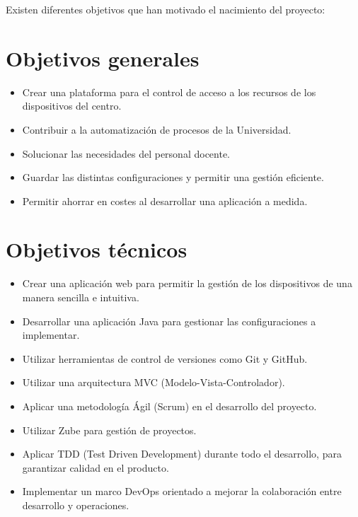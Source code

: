 
Existen diferentes objetivos que han motivado el nacimiento del proyecto:

\section{Objetivos generales}\label{sec:objetivos-generales}
    \begin{itemize}
        \item Crear una plataforma para el control de acceso a los recursos de los dispositivos del centro.
        \item Contribuir a la automatización de procesos de la Universidad.
        \item Solucionar las necesidades del personal docente.
        \item Guardar las distintas configuraciones y permitir una gestión eficiente.
        \item Permitir ahorrar en costes al desarrollar una aplicación a medida.
    \end{itemize}


\section{Objetivos técnicos}\label{sec:objetivos-tecnicos}
    \begin{itemize}
        \item Crear una aplicación web para permitir la gestión de los dispositivos de una manera sencilla e intuitiva.
        \item Desarrollar una aplicación Java para gestionar las configuraciones a implementar.
        \item Utilizar herramientas de control de versiones como Git y GitHub.
        \item Utilizar una arquitectura MVC (Modelo-Vista-Controlador).
        \item Aplicar una metodología Ágil (Scrum) en el desarrollo del proyecto.
        \item Utilizar Zube para gestión de proyectos.
        \item Aplicar TDD (Test Driven Development) durante todo el desarrollo, para garantizar calidad en el producto.
        \item Implementar un marco DevOps orientado a mejorar la colaboración entre desarrollo y operaciones.
    \end{itemize}

